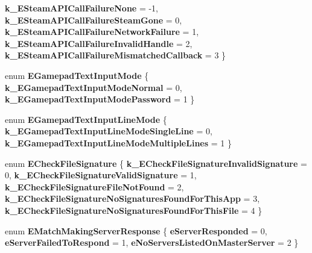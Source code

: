 \begin{DoxyCompactItemize}
{\bfseries k\+\_\+\+E\+Steam\+A\+P\+I\+Call\+Failure\+None} = -\/1, 
{\bfseries k\+\_\+\+E\+Steam\+A\+P\+I\+Call\+Failure\+Steam\+Gone} = 0, 
{\bfseries k\+\_\+\+E\+Steam\+A\+P\+I\+Call\+Failure\+Network\+Failure} = 1, 
{\bfseries k\+\_\+\+E\+Steam\+A\+P\+I\+Call\+Failure\+Invalid\+Handle} = 2, 
\newline
{\bfseries k\+\_\+\+E\+Steam\+A\+P\+I\+Call\+Failure\+Mismatched\+Callback} = 3
 \}
\item 
\mbox{\label{namespace_valve_1_1_steamworks_a6e13d80af9284f0ae6147eb577039b7b}} 
enum {\bfseries E\+Gamepad\+Text\+Input\+Mode} \{ {\bfseries k\+\_\+\+E\+Gamepad\+Text\+Input\+Mode\+Normal} = 0, 
{\bfseries k\+\_\+\+E\+Gamepad\+Text\+Input\+Mode\+Password} = 1
 \}
\item 
\mbox{\label{namespace_valve_1_1_steamworks_a0d82182d4dc5da258194c76dc9e699fa}} 
enum {\bfseries E\+Gamepad\+Text\+Input\+Line\+Mode} \{ {\bfseries k\+\_\+\+E\+Gamepad\+Text\+Input\+Line\+Mode\+Single\+Line} = 0, 
{\bfseries k\+\_\+\+E\+Gamepad\+Text\+Input\+Line\+Mode\+Multiple\+Lines} = 1
 \}
\item 
\mbox{\label{namespace_valve_1_1_steamworks_a6e2bbb8d88f44a42f907d0ad18a84d77}} 
enum {\bfseries E\+Check\+File\+Signature} \{ \newline
{\bfseries k\+\_\+\+E\+Check\+File\+Signature\+Invalid\+Signature} = 0, 
{\bfseries k\+\_\+\+E\+Check\+File\+Signature\+Valid\+Signature} = 1, 
{\bfseries k\+\_\+\+E\+Check\+File\+Signature\+File\+Not\+Found} = 2, 
{\bfseries k\+\_\+\+E\+Check\+File\+Signature\+No\+Signatures\+Found\+For\+This\+App} = 3, 
\newline
{\bfseries k\+\_\+\+E\+Check\+File\+Signature\+No\+Signatures\+Found\+For\+This\+File} = 4
 \}
\item 
\mbox{\label{namespace_valve_1_1_steamworks_a71daa6845484c22eb64ce353fc01cbd1}} 
enum {\bfseries E\+Match\+Making\+Server\+Response} \{ {\bfseries e\+Server\+Responded} = 0, 
{\bfseries e\+Server\+Failed\+To\+Respond} = 1, 
{\bfseries e\+No\+Servers\+Listed\+On\+Master\+Server} = 2
 \}
\item 
\mbox{\label{namespace_valve_1_1_steamworks_a0a120aeddfa1362e71f97121024a6f49}} 

\end{DoxyCompactItemize}
